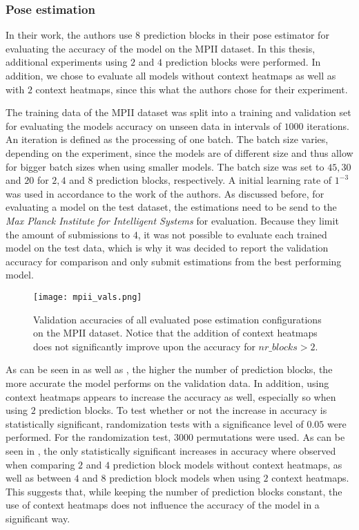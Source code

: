 \subsubsection{Pose estimation}

In their work, the authors use $8$ prediction blocks in their pose estimator for evaluating the accuracy of the model on the MPII dataset.
In this thesis, additional experiments using $2$ and $4$ prediction blocks were performed.
In addition, we chose to evaluate all models without context heatmaps as well as with $2$ context heatmaps, since this what the authors chose for their experiment.

The training data of the MPII dataset was split into a training and validation set for evaluating the models accuracy on unseen data in intervals of $1000$ iterations.
An iteration is defined as the processing of one batch.
The batch size varies, depending on the experiment, since the models are of different size and thus allow for bigger batch sizes when using smaller models.
The batch size was set to $45, 30$ and $20$ for $2, 4$ and $8$ prediction blocks, respectively.
A initial learning rate of $1^{-3}$ was used in accordance to the work of the authors.
As discussed before, for evaluating a model on the test dataset, the estimations need to be send to the \textit{Max Planck Institute for Intelligent Systems} for evaluation.
Because they limit the amount of submissions to $4$, it was not possible to evaluate each trained model on the test data, which is why it was decided to report the validation accuracy for comparison and only submit estimations from the best performing model.

\begin{figure}[htb!]
    \centering
    \texttt{[image: mpii\_vals.png]}
    \caption{Validation accuracies of all evaluated pose estimation configurations on the MPII dataset. Notice that the addition of context heatmaps does not significantly improve upon the accuracy for $nr\_blocks > 2$. }
    \label{fig:mpii_vals}
\end{figure}

As can be seen in  as well as , the higher the number of prediction blocks, the more accurate the model performs on the validation data.
In addition, using context heatmaps appears to increase the accuracy as well, especially so when using $2$ prediction blocks.
To test whether or not the increase in accuracy is statistically significant, randomization tests with a significance level of $0.05$ were performed.
For the randomization test, $3000$ permutations were used.
As can be seen in , the only statistically significant increases in accuracy where observed when comparing $2$ and $4$ prediction block models without context heatmaps, as well as between $4$ and $8$ prediction block models when using $2$ context heatmaps.
This suggests that, while keeping the number of prediction blocks constant, the use of context heatmaps does not influence the accuracy of the model in a significant way.

